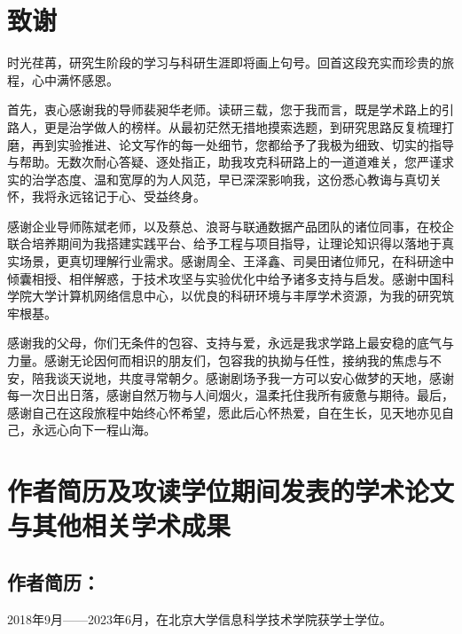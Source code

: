 \chapter[致谢]{致\quad 谢}%

时光荏苒，研究生阶段的学习与科研生涯即将画上句号。回首这段充实而珍贵的旅程，心中满怀感恩。

首先，衷心感谢我的导师裴昶华老师。读研三载，您于我而言，既是学术路上的引路人，更是治学做人的榜样。从最初茫然无措地摸索选题，到研究思路反复梳理打磨，再到实验推进、论文写作的每一处细节，您都给予了我极为细致、切实的指导与帮助。无数次耐心答疑、逐处指正，助我攻克科研路上的一道道难关，您严谨求实的治学态度、温和宽厚的为人风范，早已深深影响我，这份悉心教诲与真切关怀，我将永远铭记于心、受益终身。

感谢企业导师陈斌老师，以及蔡总、浪哥与联通数据产品团队的诸位同事，在校企联合培养期间为我搭建实践平台、给予工程与项目指导，让理论知识得以落地于真实场景，更真切理解行业需求。感谢周全、王泽鑫、司昊田诸位师兄，在科研途中倾囊相授、相伴解惑，于技术攻坚与实验优化中给予诸多支持与启发。感谢中国科学院大学计算机网络信息中心，以优良的科研环境与丰厚学术资源，为我的研究筑牢根基。

感谢我的父母，你们无条件的包容、支持与爱，永远是我求学路上最安稳的底气与力量。感谢无论因何而相识的朋友们，包容我的执拗与任性，接纳我的焦虑与不安，陪我谈天说地，共度寻常朝夕。感谢剧场予我一方可以安心做梦的天地，感谢每一次日出日落，感谢自然万物与人间烟火，温柔托住我所有疲惫与期待。最后，感谢自己在这段旅程中始终心怀希望，愿此后心怀热爱，自在生长，见天地亦见自己，永远心向下一程山海。


\chapter{作者简历及攻读学位期间发表的学术论文与其他相关学术成果}

\section*{作者简历：}
2018年9月——2023年6月，在北京大学信息科学技术学院获学士学位。

